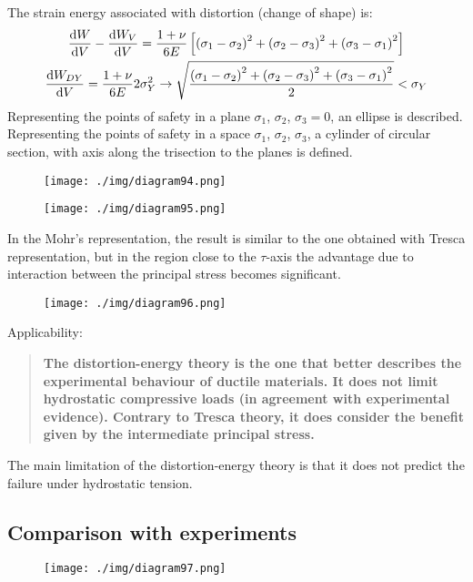 The strain energy associated with distortion (change of shape) is:
\begin{gather}
  \frac{\dif W}{\dif V} - \frac{\dif W_V}{\dif V} = \frac{1+ \nu}{6E} \left[\left(\sigma_1 - \sigma_2\right)^2 + \left(\sigma_2-\sigma_3\right)^2 + \left(\sigma_3-\sigma_1\right)^2\right]\\
  \frac{\dif W_{DY}}{\dif V} = \frac{1+\nu}{6E} 2 \sigma_Y^2 \rightarrow \sqrt{\frac{\left(\sigma_1-\sigma_2\right)^2 + \left(\sigma_2-\sigma_3\right)^2 + \left(\sigma_3-\sigma_1\right)^2}{2}} < \sigma_Y
\end{gather}
Representing the points of safety in a plane $\sigma_1$, $\sigma_2$, $\sigma_3 = 0$, an ellipse is described. Representing the points of safety in a space $\sigma_1$, $\sigma_2$, $\sigma_3$, a cylinder of circular section, with axis along the trisection to the planes is defined.
\begin{figure}
  \begin{center}
    \begin{minipage}[b]{0.46\textwidth}
      \centering
      \texttt{[image: ./img/diagram94.png]}
      \caption{}
    \end{minipage}
    \begin{minipage}[b]{0.46\textwidth}
      \centering
      \texttt{[image: ./img/diagram95.png]}
      \caption{}
    \end{minipage}
  \end{center}
\end{figure}
In the Mohr's representation, the result is similar to the one obtained with Tresca representation, but in the region close to the $\tau$-axis the advantage due to interaction between the principal stress becomes significant.
\begin{figure}[H]
  \centering
  \texttt{[image: ./img/diagram96.png]}
  \caption{}
\end{figure}
Applicability:
\begin{quotation}
  \textbf{The distortion-energy theory is the one that better describes the experimental behaviour of ductile materials. It does not limit hydrostatic compressive loads (in agreement with experimental evidence). Contrary to Tresca theory, it does consider the benefit given by the intermediate principal stress.}
\end{quotation}
The main limitation of the distortion-energy theory is that it does not predict the failure under hydrostatic tension.
\subsection{Comparison with experiments}
\begin{figure}[H]
  \centering
  \texttt{[image: ./img/diagram97.png]}
  \caption{}
\end{figure}
